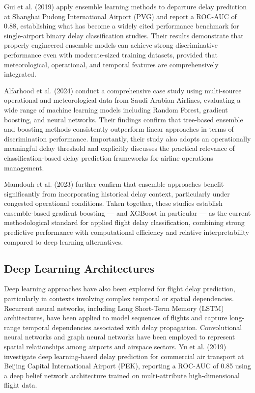 \documentclass{report}
\begin{document}
Gui et al. (2019) apply ensemble learning methods to departure delay prediction at Shanghai Pudong International Airport (PVG) and report a ROC-AUC of 0.88, establishing what has become a widely cited performance benchmark for single-airport binary delay classification studies. Their results demonstrate that properly engineered ensemble models can achieve strong discriminative performance even with moderate-sized training datasets, provided that meteorological, operational, and temporal features are comprehensively integrated.

Alfarhood et al. (2024) conduct a comprehensive case study using multi-source operational and meteorological data from Saudi Arabian Airlines, evaluating a wide range of machine learning models including Random Forest, gradient boosting, and neural networks. Their findings confirm that tree-based ensemble and boosting methods consistently outperform linear approaches in terms of discrimination performance. Importantly, their study also adopts an operationally meaningful delay threshold and explicitly discusses the practical relevance of classification-based delay prediction frameworks for airline operations management.

Mamdouh et al. (2023) further confirm that ensemble approaches benefit significantly from incorporating historical delay context, particularly under congested operational conditions. Taken together, these studies establish ensemble-based gradient boosting --- and XGBoost in particular --- as the current methodological standard for applied flight delay classification, combining strong predictive performance with computational efficiency and relative interpretability compared to deep learning alternatives.


\subsection{Deep Learning Architectures}

Deep learning approaches have also been explored for flight delay prediction, particularly in contexts involving complex temporal or spatial dependencies. Recurrent neural networks, including Long Short-Term Memory (LSTM) architectures, have been applied to model sequences of flights and capture long-range temporal dependencies associated with delay propagation. Convolutional neural networks and graph neural networks have been employed to represent spatial relationships among airports and airspace sectors. Yu et al. (2019) investigate deep learning-based delay prediction for commercial air transport at Beijing Capital International Airport (PEK), reporting a ROC-AUC of 0.85 using a deep belief network architecture trained on multi-attribute high-dimensional flight data.
\end{document}
